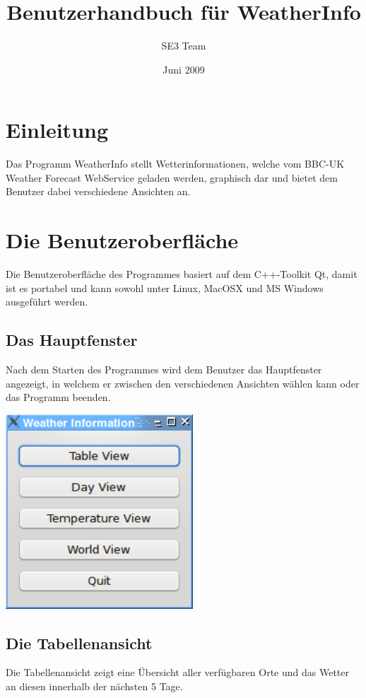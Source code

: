 \documentclass[a4paper]{scrreprt}
\begin{document}
\title{Benutzerhandbuch f\"ur WeatherInfo}
\author{SE3 Team}
\date{Juni 2009}

\maketitle

\tableofcontents

\chapter{Einleitung}
Das Programm WeatherInfo stellt Wetterinformationen, welche vom BBC-UK Weather Forecast
WebService geladen werden, graphisch dar und bietet dem Benutzer dabei verschiedene
Ansichten an.

\chapter{Die Benutzeroberfl\"ache}
Die Benutzeroberfl\"ache des Programmes basiert auf dem C++-Toolkit Qt, damit ist
es portabel und kann sowohl unter Linux, MacOSX und MS Windows ausgef\"uhrt werden.

\section{Das Hauptfenster}
Nach dem Starten des Programmes wird dem Benutzer das Hauptfenster angezeigt,
in welchem er zwischen den verschiedenen Ansichten w\"ahlen kann oder das
Programm beenden.

\begin{center}
\includegraphics[width=7cm]{mainwidget.png}
\end{center}

\section{Die Tabellenansicht}
Die Tabellenansicht zeigt eine \"Ubersicht aller verf\"ugbaren Orte und das
Wetter an diesen innerhalb der n\"achsten 5 Tage.
\end{document}
